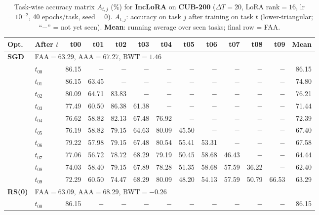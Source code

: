 \begin{table}[ht]
\centering
\caption{%
  Task-wise accuracy matrix $A_{t,j}$ (\%) for \textbf{IncLoRA} on \textbf{CUB-200} ($\Delta T=20$, LoRA rank$=16$, lr$=10^{-2}$, 40 epochs/task, seed$=0$).
  $A_{t,j}$: accuracy on task $j$ after training on task $t$  (lower-triangular; ``$-$'' = not yet seen).
  \textbf{Mean}: running average over seen tasks; final row = FAA.
}
\label{tab:raw_inclora_cub200}
\setlength{\tabcolsep}{2.8pt}
\renewcommand{\arraystretch}{0.88}
\scriptsize
\begin{tabular}{@{}l l r r r r r r r r r r r@{}}
\toprule
\textbf{Opt.} & \textbf{After $t$} & \textbf{t00} & \textbf{t01} & \textbf{t02} & \textbf{t03} & \textbf{t04} & \textbf{t05} & \textbf{t06} & \textbf{t07} & \textbf{t08} & \textbf{t09} & \textbf{Mean} \\
\midrule
\multirow{11}{*}{\textbf{SGD}} & \multicolumn{12}{l}{\quad\small FAA$=63.29$,\; AAA$=67.27$,\; BWT$=1.46$} \\
 & $t_{00}$ & 86.15 & $-$ & $-$ & $-$ & $-$ & $-$ & $-$ & $-$ & $-$ & $-$ & 86.15 \\
 & $t_{01}$ & 86.15 & 63.45 & $-$ & $-$ & $-$ & $-$ & $-$ & $-$ & $-$ & $-$ & 74.80 \\
 & $t_{02}$ & 80.09 & 64.71 & 83.83 & $-$ & $-$ & $-$ & $-$ & $-$ & $-$ & $-$ & 76.21 \\
 & $t_{03}$ & 77.49 & 60.50 & 86.38 & 61.38 & $-$ & $-$ & $-$ & $-$ & $-$ & $-$ & 71.44 \\
 & $t_{04}$ & 76.62 & 58.82 & 82.13 & 67.48 & 76.92 & $-$ & $-$ & $-$ & $-$ & $-$ & 72.39 \\
 & $t_{05}$ & 76.19 & 58.82 & 79.15 & 64.63 & 80.09 & 45.50 & $-$ & $-$ & $-$ & $-$ & 67.40 \\
 & $t_{06}$ & 79.22 & 57.98 & 79.15 & 67.48 & 80.54 & 55.41 & 53.31 & $-$ & $-$ & $-$ & 67.58 \\
 & $t_{07}$ & 77.06 & 56.72 & 78.72 & 68.29 & 79.19 & 50.45 & 58.68 & 46.43 & $-$ & $-$ & 64.44 \\
 & $t_{08}$ & 74.03 & 58.40 & 79.15 & 67.89 & 78.28 & 51.35 & 58.68 & 57.59 & 36.22 & $-$ & 62.40 \\
 & $t_{09}$ & 72.29 & 60.50 & 74.47 & 68.29 & 80.09 & 48.20 & 54.13 & 57.59 & 50.79 & 66.53 & 63.29 \\
\midrule
\multirow{11}{*}{\textbf{RS(0)}} & \multicolumn{12}{l}{\quad\small FAA$=63.09$,\; AAA$=68.29$,\; BWT$=-0.26$} \\
 & $t_{00}$ & 86.15 & $-$ & $-$ & $-$ & $-$ & $-$ & $-$ & $-$ & $-$ & $-$ & 86.15 \\

\end{tabular}
\end{table}
